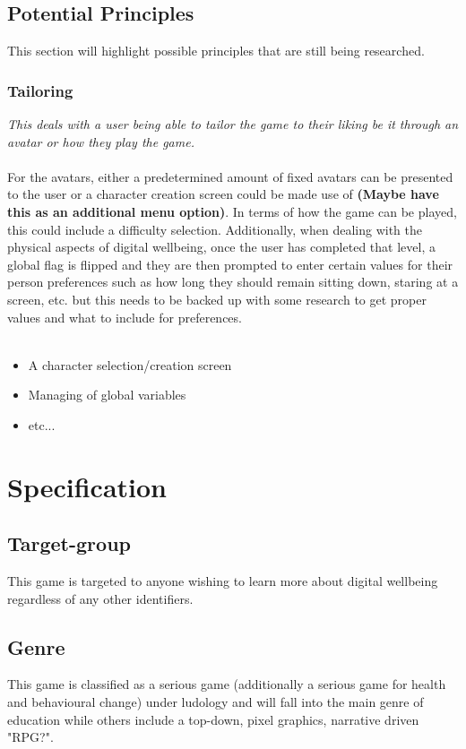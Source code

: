 \documentclass[a4paper]{scrreprt}
\begin{document}
\section{Potential Principles}
This section will highlight possible principles that are still being researched.

\subsection{Tailoring}
\textit{This deals with a user being able to tailor the game to their liking be it through an avatar or how they play the game.}
\\\\
For the avatars, either a predetermined amount of fixed avatars can be presented to the user or a character creation screen could be made use of \textbf{(Maybe have this as an additional menu option)}. In terms of how the game can be played, this could include a difficulty selection. Additionally, when dealing with the physical aspects of digital wellbeing, once the user has completed that level, a global flag is flipped and they are then prompted to enter certain values for their person preferences such as how long they should remain sitting down, staring at a screen, etc. but this needs to be backed up with some research to get proper values and what to include for preferences.
\\\\
\begin{itemize}
\item A character selection/creation screen
\item Managing of global variables
\item etc...
\end{itemize}


\chapter{Specification}
 

\section{Target-group}
This game is targeted to anyone wishing to learn more about digital wellbeing regardless of any other identifiers.

\section{Genre}
This game is classified as a serious game (additionally a serious game for health and behavioural change) under ludology and will fall into the main genre of education while others include a top-down, pixel graphics, narrative driven "RPG?".
\end{document}
